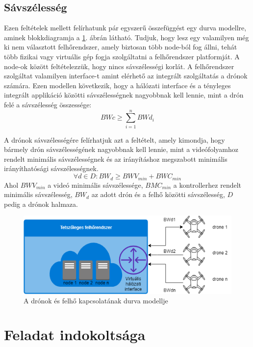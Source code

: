 \subsection{Sávszélesség}
\noindent
Ezen feltételek mellett felírhatunk pár egyszerű összefüggést egy durva modellre, aminek blokkdiagramja a \ref{fig:dronecommunicationtocloud}. ábrán látható. Tudjuk, hogy lesz egy valamilyen még ki nem választott felhőrendszer, amely biztosan több node-ból fog állni, tehát több fizikai vagy virtuális gép fogja szolgáltatni a felhőrendszer platformját. A node-ok között feltételezzük, hogy nincs sávszélességi korlát. A felhőrendszer szolgáltat valamilyen interface-t amint elérhető az integrált szolgáltatás a drónok számára. Ezen modellen következik, hogy a hálózati interface és a tényleges integrált applikáció közötti sávszélességnek nagyobbnak kell lennie, mint a drón felé a sávszélesség összessége:
\begin{equation}
BWc \geq \sum_{i=1}^{n}{BWd_i}
\end{equation}

A drónok sávszélességére felírhatjuk azt a feltételt, amely kimondja, hogy bármely drón sávszélességének nagyobbnak kell lennie, mint a videófolyamhoz rendelt minimális sávszélességnek és az irányításhoz megszabott minimális irányíthatósági sávszélességnek.
\begin{equation}
\forall d \in D: BW_d \geq BWV_{min} + BWC_{min}
\end{equation}
Ahol $BWV_{min}$ a videó minimális sávszélessége, $BMC_{min}$ a kontrollerhez rendelt minimális sávszélesség, $BW_d$ az adott drón és a felhő közötti sávszélesség, $D$ pedig a drónok halmaza.

\begin{figure}
	\centering
	\includegraphics[width=\linewidth]{figures/drone_communication_to_cloud.png}
	\caption{A drónok és felhő kapcsolatának durva modellje}
	\label{fig:dronecommunicationtocloud}
\end{figure}

\section{Feladat indokoltsága}
